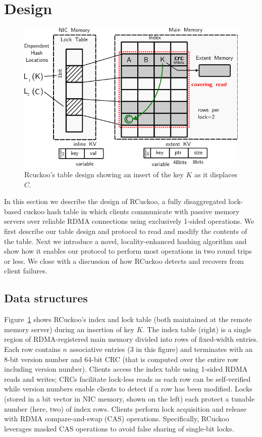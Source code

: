 \section{Design}
\label{sec:design}

\begin{figure}[t]
    \includegraphics[width=0.99\linewidth]{fig/table-diagram.pdf}
    \caption{Rcuckoo's table design showing an insert of the key $K$ as it displaces $C$.~}
    \label{fig:table-diagram}
\end{figure}

In this section we describe the design of RCuckoo, a fully
disaggregated lock-based cuckoo hash table in which clients
communicate with passive memory servers over reliable RDMA connections
using exclusively 1-sided operations.  We first describe our table
design and protocol to read and modify the contents of the table.
Next we introduce a novel, locality-enhanced hashing algorithm and show
how it enables our protocol to perform most operations in two round
trips or less.  We close with a discussion of how RCuckoo detects and
recovers from client failures.

\subsection{Data structures}
\label{sec:table-design}

Figure~\ref{fig:table-diagram} shows RCuckoo's index and lock table
(both maintained at the remote memory server) during an insertion of
key $K$.  The index table (right) is a single region of
RDMA-registered main memory divided into rows of fixed-width entries.
Each row contains $n$ associative entries (3 in this figure) and
terminates with an 8-bit version number and 64-bit CRC (that is
computed over the entire row including version number).  Clients
access the index table using 1-sided RDMA reads and writes; CRCs
facilitate lock-less reads as each row can be self-verified while
version numbers enable clients to detect if a row has been modified.
Locks (stored in a bit vector in NIC memory, shown on the left) each
protect a tunable number (here, two) of index rows.  Clients perform
lock acquisition and release with RDMA compare-and-swap (CAS)
operations.  Specifically, RCuckoo leverages masked CAS operations to
avoid false sharing of single-bit locks.


